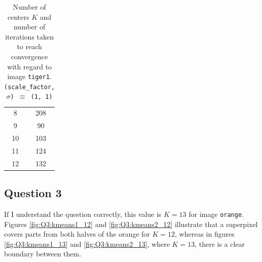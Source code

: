 \begin{table}[H]
{{\begin{minipage}[b]{0.45\hsize}
\begin{tabular}{c|c}
      8                 & 208                   \\
      9                 & 90                    \\
      10                & 103                   \\
      11                & 124                   \\
      12                & 132                   \\
    \end{tabular}
    \caption{Number of centers $K$ and number of iterations taken to reach
      convergence with regard to image \texttt{tiger1}.
      \texttt{(scale\_factor, $\sigma$) $\equiv$ (1, 1)}}
    \label{tab:convergence_tiger}
  \end{minipage}
}}
\end{table}


\subsection{Question 3}

If I understand the question correctly, this value is $K=13$ for image
\texttt{orange}.  Figures \ref{fig:Q3:kmeans1_12} and \ref{fig:Q3:kmeans2_12}
illustrate that a superpixel covers parts from both halves of the orange for $K=12$,
whereas in figures \ref{fig:Q3:kmeans1_13} and \ref{fig:Q3:kmeans2_13},
where $K=13$, there is a clear boundary between them.

